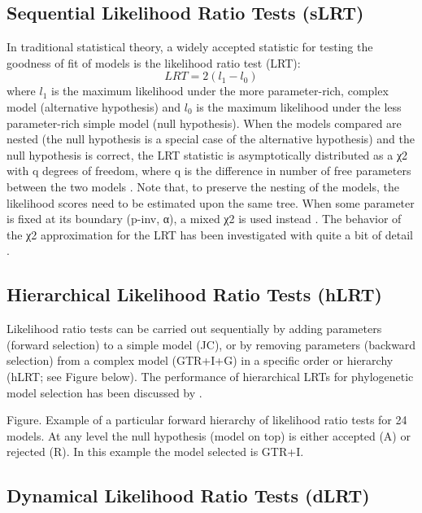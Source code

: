 \documentclass[11pt,twoside,a4paper]{article}
\begin{document}
\subsection{Sequential Likelihood Ratio Tests (sLRT)}

In traditional statistical theory, a widely accepted statistic for testing the goodness of fit of models is the likelihood ratio test (LRT): 
\[
LRT=2(l_1-l_0)
\]
where $l_1$ is the maximum likelihood under the more parameter-rich, complex model (alternative hypothesis) and $l_0$ is the maximum likelihood under the less parameter-rich simple model (null hypothesis).
 When the models compared are nested (the null hypothesis is a special case of the alternative hypothesis) and the null hypothesis is correct, the LRT statistic is asymptotically distributed as a χ2 with q degrees of freedom, where q is the difference in number of free parameters between the two models \citep{Kendall-1979, Goldman-1993b}. Note that, to preserve the nesting of the models, the likelihood scores need to be estimated upon the same tree. When some parameter is fixed at its boundary (p-inv, α), a mixed χ2 is used instead \citep{Ohta-1992, Goldman-2000}. The behavior of the χ2 approximation for the LRT has been investigated with quite a bit of detail \citep{Goldman-1993a, Goldman-1993b, Yang-1995, Whelan-1999, Goldman-2000}.

\subsection{Hierarchical Likelihood Ratio Tests (hLRT)}

Likelihood ratio tests can be carried out sequentially by adding parameters (forward selection) to a simple model (JC), or by removing parameters (backward selection) from a complex model (GTR+I+G) in a specific order or hierarchy (hLRT; see Figure below). The performance of hierarchical LRTs for phylogenetic model selection has been discussed by \citet{Posada-2004}.


Figure. Example of a particular forward hierarchy of likelihood ratio tests for 24 models. At any level the null hypothesis (model on top) is either accepted (A) or rejected (R). In this example the model selected is GTR+I.

\subsection{Dynamical Likelihood Ratio Tests (dLRT)}
\end{document}
